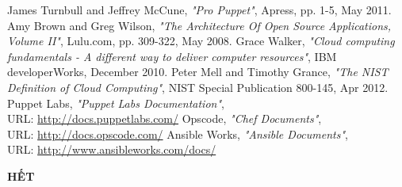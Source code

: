 \begin{thebibliography}{9}
\bibitem{} James Turnbull and Jeffrey McCune, \emph{"Pro Puppet"}, Apress, pp. 1-5, May 2011.
\bibitem{} Amy Brown and Greg Wilson, \emph{"The Architecture Of Open Source Applications, Volume II"}, Lulu.com, pp. 309-322, May 2008.
\bibitem{} Grace Walker, \emph{"Cloud computing fundamentals - A different way to deliver computer resources"}, IBM developerWorks, December 2010.
\bibitem{} Peter Mell and Timothy Grance, \emph{"The NIST Definition of Cloud Computing"}, NIST Special Publication 800-145, Apr 2012.
\bibitem{} Puppet Labs, \emph{"Puppet Labs Documentation"}, \\URL: \url{http://docs.puppetlabs.com/}
\bibitem{} Opscode, \emph{"Chef Documents"}, \\URL: \url{http://docs.opscode.com/}
\bibitem{} Ansible Works, \emph{"Ansible Documents"}, \\URL: \url{http://www.ansibleworks.com/docs/}
\end{thebibliography}

\centerline{\bf \large\MakeUppercase{Hết}}